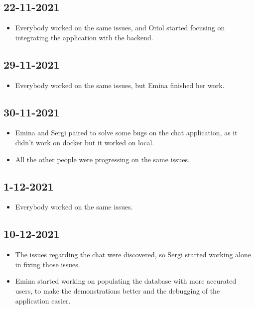 \documentclass[./main.tex]{subfiles}
\begin{document}
\subsection{22-11-2021}
\begin{itemize}
\item Everybody worked on the same issues, and Oriol started focusing on integrating the application with the backend.
\end{itemize}

\subsection{29-11-2021}
\begin{itemize}
	\item Everybody worked on the same issues, but Emina finished her work.
\end{itemize}

\subsection{30-11-2021}
\begin{itemize}
	\item Emina and Sergi paired to solve some bugs on the chat application, as it didn't work
	on docker but it worked on local.
	\item All the other people were progressing on the same issues.
\end{itemize}

\subsection{1-12-2021}
\begin{itemize}
	\item Everybody worked on the same issues.
\end{itemize}


\subsection{10-12-2021}
\begin{itemize}
	\item The issues regarding the chat were discovered, so Sergi started working alone in fixing those issues.
	\item Emina started working on populating the database with more accurated users, to make the demonstrations better and the debugging of the application easier.
\end{itemize}
\end{document}
